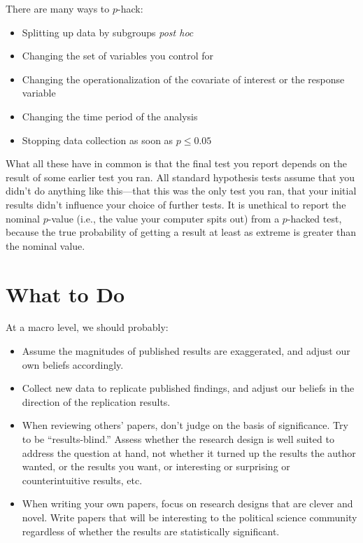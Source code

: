 \documentclass[
  12pt,
  oneside,openany]{book}
\providecommand{\tightlist}{%
  \setlength{\itemsep}{0pt}\setlength{\parskip}{0pt}}
\begin{document}
There are many ways to \(p\)-hack:

\begin{itemize}
\tightlist
\item
  Splitting up data by subgroups \emph{post hoc}
\item
  Changing the set of variables you control for
\item
  Changing the operationalization of the covariate of interest or the response variable
\item
  Changing the time period of the analysis
\item
  Stopping data collection as soon as \(p \leq 0.05\)
\end{itemize}

What all these have in common is that the final test you report depends on the result of some earlier test you ran. All standard hypothesis tests assume that you didn't do anything like this---that this was the only test you ran, that your initial results didn't influence your choice of further tests. It is unethical to report the nominal \(p\)-value (i.e., the value your computer spits out) from a \(p\)-hacked test, because the true probability of getting a result at least as extreme is greater than the nominal value.

\hypertarget{what-to-do}{%
\section{What to Do}\label{what-to-do}}

At a macro level, we should probably:

\begin{itemize}
\item
  Assume the magnitudes of published results are exaggerated, and adjust our own beliefs accordingly.
\item
  Collect new data to replicate published findings, and adjust our beliefs in the direction of the replication results.
\item
  When reviewing others' papers, don't judge on the basis of significance. Try to be ``results-blind.'' Assess whether the research design is well suited to address the question at hand, not whether it turned up the results the author wanted, or the results you want, or interesting or surprising or counterintuitive results, etc.
\item
  When writing your own papers, focus on research designs that are clever and novel. Write papers that will be interesting to the political science community regardless of whether the results are statistically significant.
\end{itemize}
\end{document}
